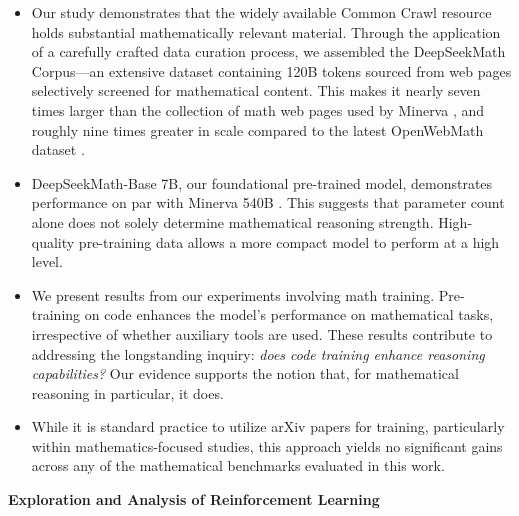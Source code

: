 \begin{itemize}[topsep=0pt]
    \item Our study demonstrates that the widely available Common Crawl resource holds substantial mathematically relevant material. Through the application of a carefully crafted data curation process, we assembled the DeepSeekMath Corpus—an extensive dataset containing 120B tokens sourced from web pages selectively screened for mathematical content. This makes it nearly seven times larger than the collection of math web pages used by Minerva \citep{minerva}, and roughly nine times greater in scale compared to the latest OpenWebMath dataset \citep{openwebmath}.

\item DeepSeekMath-Base 7B, our foundational pre-trained model, demonstrates performance on par with Minerva 540B \citep{minerva}. This suggests that parameter count alone does not solely determine mathematical reasoning strength. High-quality pre-training data allows a more compact model to perform at a high level.

\item We present results from our experiments involving math training. Pre-training on code enhances the model's performance on mathematical tasks, irrespective of whether auxiliary tools are used. These results contribute to addressing the longstanding inquiry: \textit{does code training enhance reasoning capabilities?} Our evidence supports the notion that, for mathematical reasoning in particular, it does.

\item While it is standard practice to utilize arXiv papers for training, particularly within mathematics-focused studies, this approach yields no significant gains across any of the mathematical benchmarks evaluated in this work.
\end{itemize}

\textbf{Exploration and Analysis of Reinforcement Learning}

